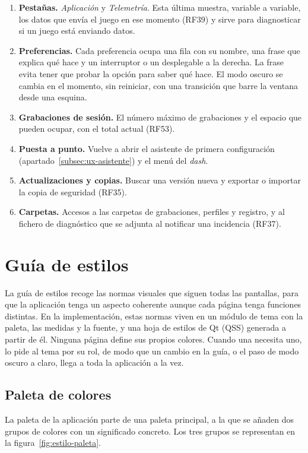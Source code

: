 \begin{enumerate}
	\item \textbf{Pestañas.} \textit{Aplicación} y \textit{Telemetría}. Esta última muestra, variable a variable, los datos que envía el juego en ese momento (RF39) y sirve para diagnosticar si un juego está enviando datos.
	\item \textbf{Preferencias.} Cada preferencia ocupa una fila con su nombre, una frase que explica qué hace y un interruptor o un desplegable a la derecha. La frase evita tener que probar la opción para saber qué hace. El modo oscuro se cambia en el momento, sin reiniciar, con una transición que barre la ventana desde una esquina.
	\item \textbf{Grabaciones de sesión.} El número máximo de grabaciones y el espacio que pueden ocupar, con el total actual (RF53).
	\item \textbf{Puesta a punto.} Vuelve a abrir el asistente de primera configuración (apartado~\ref{subsec:ux-asistente}) y el menú del \textit{dash}.
	\item \textbf{Actualizaciones y copias.} Buscar una versión nueva y exportar o importar la copia de seguridad (RF35).
	\item \textbf{Carpetas.} Accesos a las carpetas de grabaciones, perfiles y registro, y al fichero de diagnóstico que se adjunta al notificar una incidencia (RF37).
\end{enumerate}

\section{Guía de estilos}
\label{sec:guia-estilos}
La guía de estilos recoge las normas visuales que siguen todas las pantallas, para que la aplicación tenga un aspecto coherente aunque cada página tenga funciones distintas. En la implementación, estas normas viven en un módulo de tema con la paleta, las medidas y la fuente, y una hoja de estilos de Qt (QSS) generada a partir de él. Ninguna página define sus propios colores. Cuando una necesita uno, lo pide al tema por su rol, de modo que un cambio en la guía, o el paso de modo oscuro a claro, llega a toda la aplicación a la vez.

\subsection{Paleta de colores}
\label{subsec:estilo-colores}
La paleta de la aplicación parte de una paleta principal, a la que se añaden dos grupos de colores con un significado concreto. Los tres grupos se representan en la figura~\ref{fig:estilo-paleta}.

